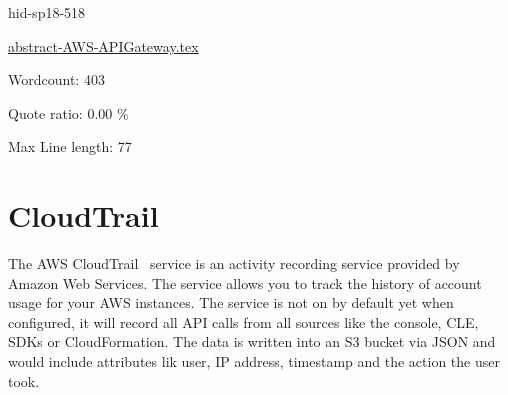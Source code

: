 \begin{IU}

hid-sp18-518

\href{https://github.com/cloudmesh-community/hid-sp18-518/blob/master//technology/abstract-AWS-APIGateway.tex}{abstract-AWS-APIGateway.tex}

 

Wordcount: 403


Quote ratio: 0.00 \%
 
Max Line length: 77
\end{IU}

\section{CloudTrail}

The AWS CloudTrail~\cite{hid-sp18-518-CloudTrail} service is an activity 
recording service provided by Amazon Web Services. The service allows you 
to track the history of account usage for your AWS instances. The service 
is not on by default yet when configured, it will record all API calls from
all sources like the console, CLE, SDKs or CloudFormation. The data is 
written into an S3 bucket via JSON and would include attributes lik user,
IP address, timestamp and the action the user took.








